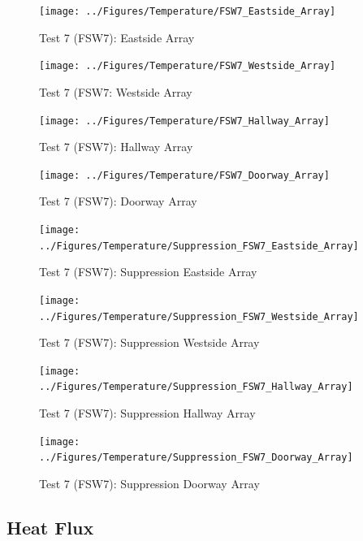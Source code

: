\documentclass[12pt,oneside]{book}
\begin{document}
\begin{figure}[!ht]
	\texttt{[image: ../Figures/Temperature/FSW7\_Eastside\_Array]}
	\caption{Test 7 (FSW7): Eastside Array}
	\label{fig:Test_7_Eastside_Array}
\end{figure}

\begin{figure}[!ht]
	\texttt{[image: ../Figures/Temperature/FSW7\_Westside\_Array]}
	\caption{Test 7 (FSW7: Westside Array}
	\label{fig:Test_7_Westside_Array}
\end{figure}

\begin{figure}[!ht]
	\texttt{[image: ../Figures/Temperature/FSW7\_Hallway\_Array]}
	\caption{Test 7 (FSW7): Hallway Array}
	\label{fig:Test_7_Hallway_Array}
\end{figure}

\begin{figure}[!ht]
	\texttt{[image: ../Figures/Temperature/FSW7\_Doorway\_Array]}
	\caption{Test 7 (FSW7): Doorway Array}
	\label{fig:Test_7_Doorway_Array}
\end{figure}

\begin{figure}[!ht]
	\texttt{[image: ../Figures/Temperature/Suppression\_FSW7\_Eastside\_Array]}
	\caption{Test 7 (FSW7): Suppression Eastside Array}
	\label{fig:Test_7_Suppression_Eastside_Array}
\end{figure}

\begin{figure}[!ht]
	\texttt{[image: ../Figures/Temperature/Suppression\_FSW7\_Westside\_Array]}
	\caption{Test 7 (FSW7): Suppression Westside Array}
	\label{fig:Test_7_Suppression_Westside_Array}
\end{figure}

\begin{figure}[!ht]
	\texttt{[image: ../Figures/Temperature/Suppression\_FSW7\_Hallway\_Array]}
	\caption{Test 7 (FSW7): Suppression Hallway Array}
	\label{fig:Test_7_Suppression_Hallway_Array}
\end{figure}

\begin{figure}[!ht]
	\texttt{[image: ../Figures/Temperature/Suppression\_FSW7\_Doorway\_Array]}
	\caption{Test 7 (FSW7): Suppression Doorway Array}
	\label{fig:Test_7_Suppression_Doorway_Array}
\end{figure}

\subsection{Heat Flux}
\label{subsec:Heat_Flux}
\end{document}
